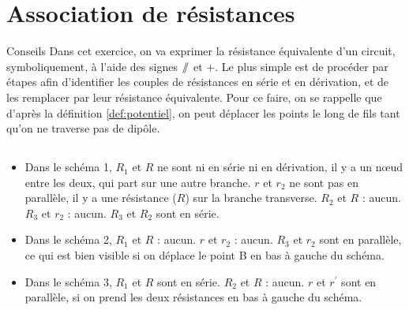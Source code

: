 \documentclass[10pt,a5paper,notitlepage]{book}
\begin{document}
\section{Association de résistances}

\begin{NCcoro}{Conseils}
    Dans cet exercice, on va exprimer la résistance équivalente d'un circuit,
    symboliquement, à l'aide des signes $/\!\!/ $ et $+$. Le plus simple est de
    procéder par étapes afin d'identifier les couples de résistances en série et
    en dérivation, et de les remplacer par leur résistance équivalente. Pour ce
    faire, on se rappelle que d'après la définition \ref{def:potentiel}, on peut
    déplacer les points le long de fils tant qu'on ne traverse pas de dipôle.
\end{NCcoro}

\subsection{}

\begin{itemize}
    \item Dans le schéma 1, $R_1$ et $R$ ne sont ni en série ni en dérivation,
        il y a un nœud entre les deux, qui part sur une autre branche. $r$
        et $r_2$ ne sont pas en parallèle, il y a une résistance ($R$) sur la
        branche transverse. $R_2$ et $R$ : aucun. $R_3$ et $r_2$ : aucun. $R_3$
        et $R_2$ sont en série.
    \item Dans le schéma 2, $R_1$ et $R$ : aucun. $r$ et $r_2$ : aucun. $R_3$ et
        $r_2$ sont en parallèle, ce qui est bien visible si on déplace le point
        B en bas à gauche du schéma.
    \item Dans le schéma 3, $R_1$ et $R$ sont en série. $R_2$ et $R$ : aucun.
        $r$ et $r^\prime$ sont en parallèle, si on prend les deux résistances en
        bas à gauche du schéma.
\end{itemize}
\end{document}
